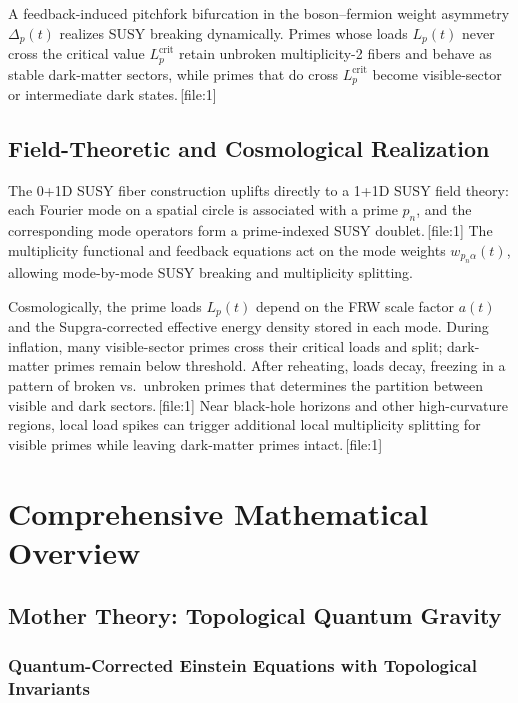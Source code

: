 \documentclass[11pt]{article}
\begin{document}
A feedback-induced pitchfork bifurcation in the boson--fermion weight asymmetry \(\Delta_p(t)\) realizes SUSY breaking dynamically. Primes whose loads \(L_p(t)\) never cross the critical value \(L_p^{\mathrm{crit}}\) retain unbroken multiplicity-2 fibers and behave as stable dark-matter sectors, while primes that do cross \(L_p^{\mathrm{crit}}\) become visible-sector or intermediate dark states.\,[file:1]

\subsection{Field-Theoretic and Cosmological Realization}

The 0+1D SUSY fiber construction uplifts directly to a 1+1D SUSY field theory: each Fourier mode on a spatial circle is associated with a prime \(p_n\), and the corresponding mode operators form a prime-indexed SUSY doublet.\,[file:1] The multiplicity functional and feedback equations act on the mode weights \(w_{p_n\alpha}(t)\), allowing mode-by-mode SUSY breaking and multiplicity splitting.

Cosmologically, the prime loads \(L_p(t)\) depend on the FRW scale factor \(a(t)\) and the Supgra-corrected effective energy density stored in each mode. During inflation, many visible-sector primes cross their critical loads and split; dark-matter primes remain below threshold. After reheating, loads decay, freezing in a pattern of broken vs.\ unbroken primes that determines the partition between visible and dark sectors.\,[file:1] Near black-hole horizons and other high-curvature regions, local load spikes can trigger additional local multiplicity splitting for visible primes while leaving dark-matter primes intact.\,[file:1]

\section{Comprehensive Mathematical Overview}

\subsection{Mother Theory: Topological Quantum Gravity}

\subsubsection{Quantum-Corrected Einstein Equations with Topological Invariants}
\end{document}
